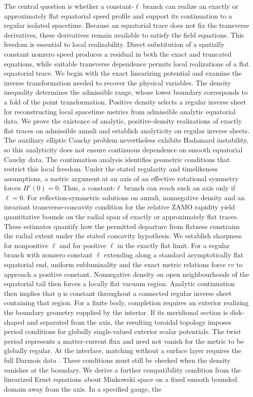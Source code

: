 \documentclass[amsmath,amsfonts,amssymb,aps,pra,superscriptaddress,10pt]{revtex4-2}
\numberwithin{equation}{section}
\theoremstyle{plain}
\theoremstyle{definition}
\theoremstyle{remark}
\theoremstyle{definition}
\begin{document}
The central question is whether a constant-$\ell$ branch can realize an exactly or approximately flat equatorial speed profile and support its continuation to a regular isolated spacetime. Because an equatorial trace does not fix the transverse derivatives, these derivatives remain available to satisfy the field equations. This freedom is essential to local realizability. Direct substitution of a spatially constant nonzero speed produces a residual in both the exact and truncated equations, while suitable transverse dependence permits local realizations of a flat equatorial trace. We begin with the exact linearizing potential and examine the inverse transformation needed to recover the physical variables. The density inequality determines the admissible range, whose lower boundary corresponds to a fold of the point transformation. Positive density selects a regular inverse sheet for reconstructing local spacetime metrics from admissible analytic equatorial data. We prove the existence of analytic, positive-density realizations of exactly flat traces on admissible annuli and establish analyticity on regular inverse sheets. The auxiliary elliptic Cauchy problem nevertheless exhibits Hadamard instability, so this analyticity does not ensure continuous dependence on smooth equatorial Cauchy data. The continuation analysis identifies geometric conditions that restrict this local freedom. Under the stated regularity and timelikeness assumptions, a metric argument at an axis of an effective rotational symmetry forces $H'(0)=0$. Thus, a constant-$\ell$ branch can reach such an axis only if $\ell=0$. For reflection-symmetric solutions on annuli, nonnegative density and an invariant transverse-concavity condition for the relative ZAMO rapidity yield quantitative bounds on the radial span of exactly or approximately flat traces. These estimates quantify how the permitted departure from flatness constrains the radial extent under the stated concavity hypothesis. We establish sharpness for nonpositive $\ell$ and for positive $\ell$ in the exactly flat limit. For a regular branch with nonzero constant $\ell$ extending along a standard asymptotically flat equatorial end, uniform subluminality and the exact metric relations force $rv$ to approach a positive constant. Nonnegative density on open neighbourhoods of the equatorial tail then forces a locally flat vacuum region. Analytic continuation then implies that $\eta$ is constant throughout a connected regular inverse sheet containing that region. For a finite body, completion requires an exterior realizing the boundary geometry supplied by the interior. If its meridional section is disk-shaped and separated from the axis, the resulting toroidal topology imposes period conditions for globally single-valued exterior scalar potentials. The twist period represents a matter-current flux and need not vanish for the metric to be globally regular. At the interface, matching without a surface layer requires the full Darmois data \cite{Darmois1927,Israel1966NCB,MarsSenovilla1993CQG}. These conditions must still be checked when the density vanishes at the boundary. We derive a further compatibility condition from the linearized Ernst equations about Minkowski space on a fixed smooth bounded domain away from the axis. In a specified gauge, the 
\end{document}
